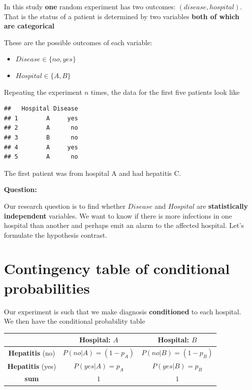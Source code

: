 \documentclass[
]{book}
\providecommand{\tightlist}{%
  \setlength{\itemsep}{0pt}\setlength{\parskip}{0pt}}
\begin{document}
In this study \textbf{one} random experiment has two outcomes: \((disease, hospital)\). That is the status of a patient is determined by two variables \textbf{both of which are categorical}

These are the possible outcomes of each variable:

\begin{itemize}
\tightlist
\item
  \(Disease \in\{no, yes\}\)
\item
  \(Hospital \in \{A,B\}\)
\end{itemize}

Repeating the experiment \(n\) times, the data for the first five patients look like

\begin{verbatim}
##   Hospital Disease
## 1        A     yes
## 2        A      no
## 3        B      no
## 4        A     yes
## 5        A      no
\end{verbatim}

The first patient was from hospital A and had hepatitis C.

\textbf{Question:}

Our research question is to find whether \(Disease\) and \(Hospital\) are \textbf{statistically independent} variables. We want to know if there is more infections in one hospital than another and perhaps emit an alarm to the affected hospital. Let's formulate the hypothesis contrast.

\hypertarget{contingency-table-of-conditional-probabilities}{%
\section{Contingency table of conditional probabilities}\label{contingency-table-of-conditional-probabilities}}

Our experiment is such that we make diagnosis \textbf{conditioned} to each hospital. We then have the conditional probability table

\begin{longtable}[]{@{}ccc@{}}
\toprule
& Hospital: \(A\) & Hospital: \(B\) \\
\midrule
\endhead
\textbf{Hepatitis} (no) & \(P(no|A)=(1-p_A)\) & \(P(no|B)=(1-p_B)\) \\
\textbf{Hepatitis} (yes) & \(P(yes|A)=p_A\) & \(P(yes|B)=p_B\) \\
\textbf{sum} & \(1\) & \(1\) \\
\bottomrule
\end{longtable}
\end{document}
